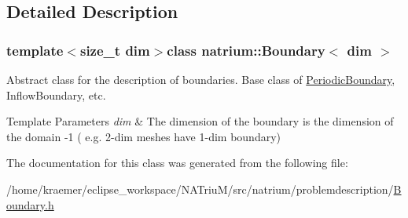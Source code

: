 \subsection{Detailed Description}
\subsubsection*{template$<$size\-\_\-t dim$>$class natrium\-::\-Boundary$<$ dim $>$}

Abstract class for the description of boundaries. Base class of \hyperlink{classnatrium_1_1PeriodicBoundary}{Periodic\-Boundary}, Inflow\-Boundary, etc. 


\begin{DoxyTemplParams}{Template Parameters}
{\em dim} & The dimension of the boundary is the dimension of the domain -\/1 ( e.\-g. 2-\/dim meshes have 1-\/dim boundary) \\
\hline
\end{DoxyTemplParams}


The documentation for this class was generated from the following file\-:\begin{DoxyCompactItemize}
\item 
/home/kraemer/eclipse\-\_\-workspace/\-N\-A\-Triu\-M/src/natrium/problemdescription/\hyperlink{Boundary_8h}{Boundary.\-h}\end{DoxyCompactItemize}
